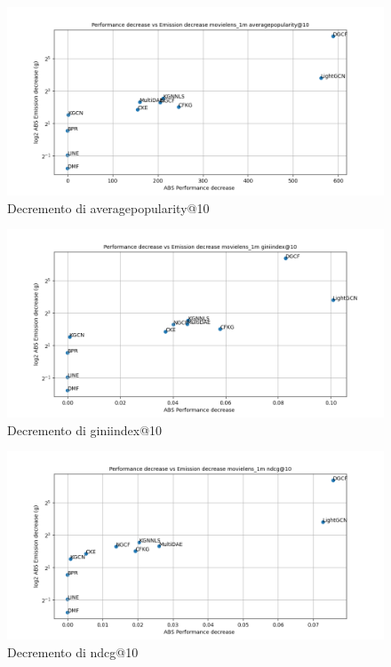 \begin{figure}[H]
    \centering
     \includegraphics[width=\textwidth]{images/decrement_averagepopularity@10_movielens_1m_40_6.png}
    \caption{Decremento di averagepopularity@10}
\end{figure}

\begin{figure}[H]
    \centering
     \includegraphics[width=\textwidth]{images/decrement_giniindex@10_movielens_1m_40_6.png}
    \caption{Decremento di giniindex@10}
\end{figure}

\begin{figure}[H]
    \centering
     \includegraphics[width=\textwidth]{images/decrement_ndcg@10_movielens_1m_40_6.png}
    \caption{Decremento di ndcg@10}
\end{figure}

